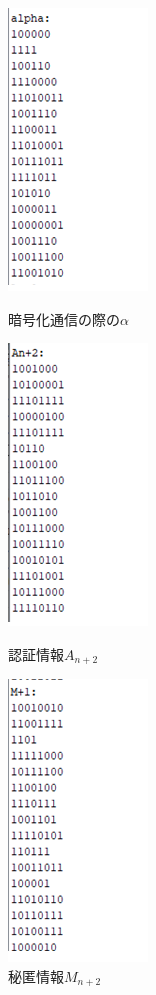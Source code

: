 \begin{figure}[H]
\begin{minipage}{0.33\hsize}
\centering
\includegraphics{ango_alpha.png}
\caption{暗号化通信の際の$\alpha$}
\label{fig:ango_alpha}
\end{minipage}
\begin{minipage}{0.33\hsize}
\centering
\includegraphics{ango_Al.png}
\caption{認証情報$A_{n+2}$}
\label{fig:ango_Al}
\end{minipage}
\begin{minipage}{0.33\hsize}
\centering
\includegraphics{ango_Mm.png}
\caption{秘匿情報$M_{n+2}$}
\label{fig:ango_Mm}
\end{minipage}
\end{figure}

